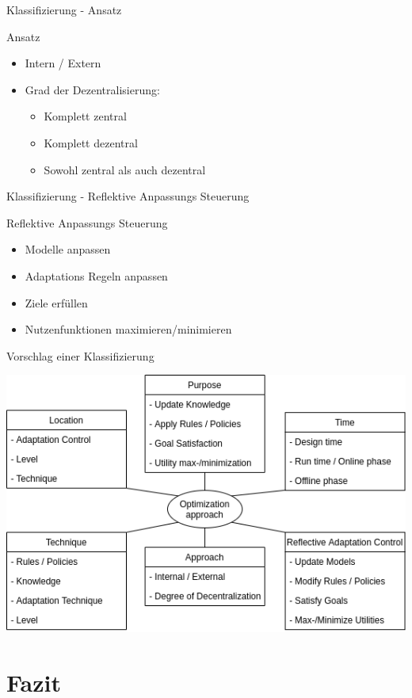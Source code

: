 \documentclass[de,16:9]{sdqbeamer}
\begin{document}
\begin{frame}{Klassifizierung - Ansatz}
	\begin{greenblock}{Ansatz}
		\begin{itemize}
			\item Intern / Extern
			\item Grad der Dezentralisierung:
			\begin{itemize}
				\item Komplett zentral
				\item Komplett dezentral
				\item Sowohl zentral als auch dezentral
			\end{itemize}
		\end{itemize}
	\end{greenblock}
\end{frame}

\begin{frame}{Klassifizierung - Reflektive Anpassungs Steuerung}
	\begin{greenblock}{Reflektive Anpassungs Steuerung}
		\begin{itemize}
			\item Modelle anpassen
			\item Adaptations Regeln anpassen
			\item Ziele erfüllen
			\item Nutzenfunktionen maximieren/minimieren
		\end{itemize}
	\end{greenblock}
\end{frame}

\begin{frame}{Vorschlag einer Klassifizierung}
	\begin{center}
		\includegraphics[width=.6\textwidth]{sources/ClassificationProposal-WithDimensions.png}
	\end{center}
\end{frame}

\section{Fazit}
\end{document}
